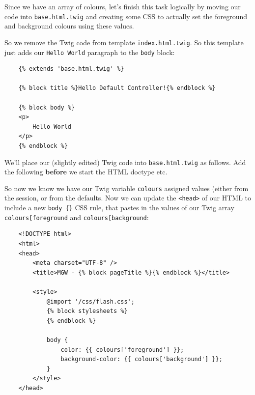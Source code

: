 \documentclass[a4paperpaper,openright]{book}
\newenvironment{Shaded}{}{}
\newcommand{\NormalTok}[1]{#1}
\begin{document}
Since we have an array of colours, let's finish this task logically by
moving our code into \texttt{base.html.twig} and creating some CSS to
actually set the foreground and background colours using these values.

So we remove the Twig code from template \texttt{index.html.twig}. So
this template just adds our \texttt{Hello\ World} paragraph to the
\texttt{body} block:

\begin{verbatim}
    {% extends 'base.html.twig' %}
    
    {% block title %}Hello Default Controller!{% endblock %}
    
    {% block body %}
    <p>
        Hello World
    </p>
    {% endblock %}
\end{verbatim}

We'll place our (slightly edited) Twig code into \texttt{base.html.twig}
as follows. Add the following \textbf{before} we start the HTML doctype
etc.

\begin{Shaded}
\end{Shaded}

So now we know we have our Twig variable \texttt{colours} assigned
values (either from the session, or from the defaults. Now we can update
the \texttt{\textless{}head\textgreater{}} of our HTML to include a new
\texttt{body\ \{\}} CSS rule, that pastes in the values of our Twig
array
\texttt{colours{[}\textquotesingle{}foreground\textquotesingle{}{]}} and
\texttt{colours{[}\textquotesingle{}background\textquotesingle{}{]}}:

\begin{verbatim}
    <!DOCTYPE html>
    <html>
    <head>
        <meta charset="UTF-8" />
        <title>MGW - {% block pageTitle %}{% endblock %}</title>

        <style>
            @import '/css/flash.css';
            {% block stylesheets %}
            {% endblock %}

            body {
                color: {{ colours['foreground'] }};
                background-color: {{ colours['background'] }};
            }
        </style>
    </head>
\end{verbatim}
\end{document}
